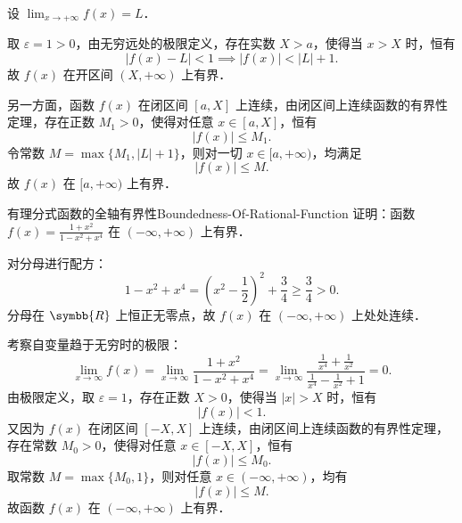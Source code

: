 \begin{myproof}
    设 $\lim_{x\to +\infty} f(x) = L$．

    取 $\varepsilon = 1 > 0$，由无穷远处的极限定义，存在实数 $X > a$，使得当 $x > X$ 时，恒有
    \begin{equation}
        |f(x) - L| < 1 \implies |f(x)| < |L| + 1.
    \end{equation}
    故 $f(x)$ 在开区间 $(X, +\infty)$ 上有界．

    另一方面，函数 $f(x)$ 在闭区间 $[a, X]$ 上连续，由闭区间上连续函数的有界性定理，存在正数 $M_1 > 0$，使得对任意 $x \in [a, X]$，恒有
    \begin{equation}
        |f(x)| \leqslant M_1.
    \end{equation}
    令常数 $M = \max\{ M_1, |L| + 1 \}$，则对一切 $x \in [a, +\infty)$，均满足
    \begin{equation}
        |f(x)| \leqslant M.
    \end{equation}
    故 $f(x)$ 在 $[a, +\infty)$ 上有界．
\end{myproof}

\begin{problem}{有理分式函数的全轴有界性}{Boundedness-Of-Rational-Function}
    证明：函数 $f(x) = \frac{1+x^2}{1-x^2+x^4}$ 在 $(-\infty, +\infty)$ 上有界．
\end{problem}

\begin{myproof}
    对分母进行配方：
    \begin{equation}
        1 - x^2 + x^4 = \left( x^2 - \frac{1}{2} \right)^2 + \frac{3}{4} \geqslant \frac{3}{4} > 0.
    \end{equation}
    分母在 $\symbb{R}$ 上恒正无零点，故 $f(x)$ 在 $(-\infty, +\infty)$ 上处处连续．

    考察自变量趋于无穷时的极限：
    \begin{equation}
        \lim_{x\to\infty} f(x) = \lim_{x\to\infty} \frac{1+x^2}{1-x^2+x^4} = \lim_{x\to\infty} \frac{\frac{1}{x^4} + \frac{1}{x^2}}{\frac{1}{x^4} - \frac{1}{x^2} + 1} = 0.
    \end{equation}
    由极限定义，取 $\varepsilon = 1$，存在正数 $X > 0$，使得当 $|x| > X$ 时，恒有
    \begin{equation}
        |f(x)| < 1.
    \end{equation}
    又因为 $f(x)$ 在闭区间 $[-X, X]$ 上连续，由闭区间上连续函数的有界性定理，存在常数 $M_0 > 0$，使得对任意 $x \in [-X, X]$，恒有
    \begin{equation}
        |f(x)| \leqslant M_0.
    \end{equation}
    取常数 $M = \max\{M_0, 1\}$，则对任意 $x \in (-\infty, +\infty)$，均有
    \begin{equation}
        |f(x)| \leqslant M.
    \end{equation}
    故函数 $f(x)$ 在 $(-\infty, +\infty)$ 上有界．
\end{myproof}

